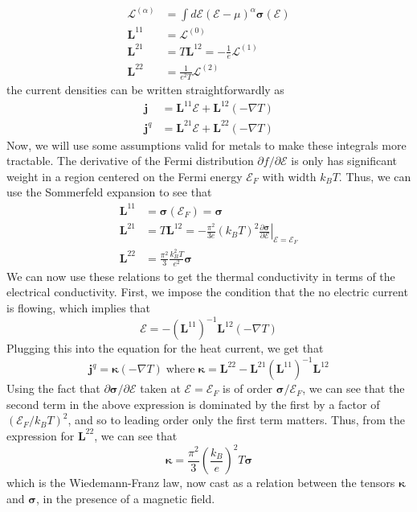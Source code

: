 \documentclass{thesis-umich}
\begin{document}
\begin{align*} \mathcal{L}^{(\alpha)} &= \int d\mathcal{E} (\mathcal{E} - \mu)^\alpha
\mathbf{\sigma}(\mathcal{E}) \\
	\mathbf{L}^{11} &= \mathcal{L}^{(0)} \\
	\mathbf{L}^{21} &= T \mathbf{L}^{12} = -\frac{1}{e}\mathcal{L}^{(1)} \\
	\mathbf{L}^{22} &= \frac{1}{e^2T} \mathcal{L}^{(2)}
\end{align*}
the current densities can be written straightforwardly as
\begin{align*}
	\mathbf{j} &= \mathbf{L}^{11}\mathbf{\mathcal{E}} +
	\mathbf{L}^{12}(-\nabla T) \\
	\mathbf{j}^q &= \mathbf{L}^{21}\mathbf{\mathcal{E}} +
	\mathbf{L}^{22}(-\nabla T)
\end{align*}
Now, we will use some assumptions valid for metals to make these integrals more
tractable. The derivative of the Fermi distribution $\partial f / \partial
\mathcal{E}$ is only has significant weight in a region centered on the Fermi energy
$\mathcal{E}_F$ with width $k_BT$. Thus, we can use the Sommerfeld expansion to
see that
\begin{align*}
	\mathbf{L}^{11} &= \mathbf{\sigma}(\mathcal{E}_F) = \mathbf{\sigma} \\
	\mathbf{L}^{21} &= T\mathbf{L}^{12} = -\frac{\pi^2}{3e}(k_BT)^2
	\left.\frac{\partial \mathbf{\sigma}}{\partial
		\mathcal{E}}\right|_{\mathcal{E} = \mathcal{E}_F} \\
	\mathbf{L}^{22} &= \frac{\pi^2}{3} \frac{k_B^2T}{e^2}\mathbf{\sigma}
\end{align*}
We can now use these relations to get the thermal conductivity in terms of the
electrical conductivity. First, we impose the condition that the no electric
current is flowing, which implies that \[ \mathbf{\mathcal{E}} = -
(\mathbf{L}^{11})^{-1} \mathbf{L}^{12}(-\nabla T)\]
Plugging this into the equation for the heat current, we get that
\[ \mathbf{j}^q = \mathbf{\kappa}(-\nabla T) \;\mathrm{ where }\; \mathbf{\kappa} = \mathbf{L}^{22} - \mathbf{L}^{21}(\mathbf{L}^{11})^{-1}\mathbf{L}^{12} \]
Using the fact that $\partial \mathbf{\sigma}/\partial \mathcal{E}$ taken at $\mathcal{E} = \mathcal{E}_F$ is of order $\mathbf{\sigma}/\mathcal{E}_F$, we can see that the second term in the above expression is dominated by the first by a factor of $(\mathcal{E}_F/k_B T)^2$, and so to leading order only the first term matters. Thus, from the expression for $\mathbf{L}^{22}$, we can see that 
\[ \mathbf{\kappa} = \frac{\pi^2}{3} \left(\frac{k_B}{e}\right)^2 T \mathbf{\sigma} \]
which is the Wiedemann-Franz law, now cast as a relation between the tensors $\mathbf{\kappa}$ and $\mathbf{\sigma}$, in the presence of a magnetic field. 
\end{document}
